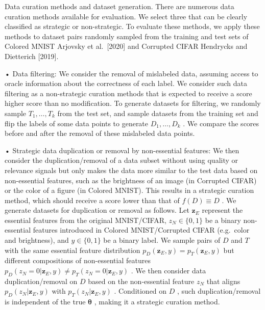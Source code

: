 Data curation methods and dataset generation. There are numerous data
curation methods available for evaluation. We select three that can be
clearly classified as strategic or non-strategic. To evaluate these
methods, we apply these methods to dataset pairs randomly sampled from
the training and test sets of Colored MNIST Arjovsky et al.~{[}2020{]}
and Corrupted CIFAR Hendrycks and Dietterich {[}2019{]}.

• Data filtering: We consider the removal of mislabeled data, assuming
access to oracle information about the correctness of each label. We
consider such data filtering as a non-strategic curation methods that is
expected to receive a score higher score than no modification. To
generate datasets for filtering, we randomly sample
\(T _ { 1 } , \dots , T _ { k }\) from the test set, and sample datasets
from the training set and flip the labels of some data points to
generate \(D _ { 1 } , \ldots , D _ { k }\) . We compare the scores
before and after the removal of these mislabeled data points.

• Strategic data duplication or removal by non-essential features: We
then consider the duplication/removal of a data subset without using
quality or relevance signals but only makes the data more similar to the
test data based on non-essential features, such as the brightness of an
image (in Corrupted CIFAR) or the color of a figure (in Colored MNIST).
This results in a strategic curation method, which should receive a
score lower than that of \(f ( D ) \equiv D\) . We generate datasets for
duplication or removal as follows. Let \(\mathbf { z } _ { E }\)
represent the essential features from the original MNIST/CIFAR,
\(z _ { N } \in \{ 0 , 1 \}\) be a binary non-essential features
introduced in Colored MNIST/Corrupted CIFAR (e.g.~color and brightness),
and \(y \in \{ 0 , 1 \}\) be a binary label. We sample pairs of \(D\)
and \(T\) with the same essential feature distribution
\(p _ { D } ( \mathbf { z } _ { E } , y ) = p _ { T } ( \mathbf { z } _ { E } , y )\)
but different compositions of non-essential features
\(p _ { D } ( z _ { N } = 0 | \mathbf { z } _ { E } , y ) \neq p _ { T } ( z _ { N } = 0 | \mathbf { z } _ { E } , y )\)
. We then consider data duplication/removal on \(D\) based on the
non-essential feature \(z _ { N }\) that aligns
\(p _ { D } ( z _ { N } | \mathbf { z } _ { E } , y )\) with
\(p _ { T } ( z _ { N } | \mathbf { z } _ { E } , y )\) . Conditioned on
\(D\) , such duplication/removal is independent of the true
\(\pmb \theta\) , making it a strategic curation method.

